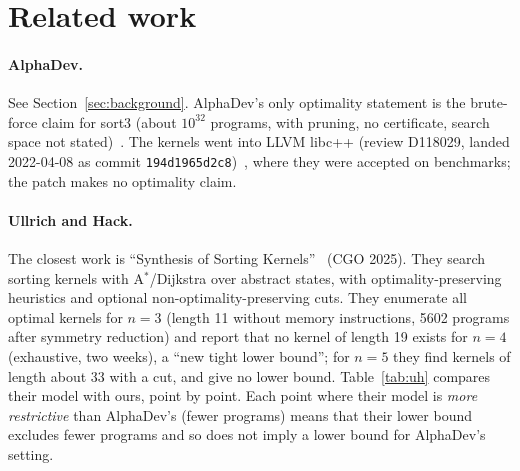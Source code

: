 \section{Related work}\label{sec:related}

\paragraph{AlphaDev.} See Section~\ref{sec:background}. AlphaDev's only optimality statement is the brute-force claim for sort3
(about $10^{32}$ programs, with pruning, no certificate, search space not stated)~\cite{alphadev}. The kernels went into
LLVM libc++ (review D118029, landed 2022-04-08 as commit \texttt{194d1965d2c8})~\cite{d118029}, where they were accepted on
benchmarks; the patch makes no optimality claim.

\paragraph{Ullrich and Hack.} The closest work is ``Synthesis of Sorting Kernels''~\cite{ullrich} (CGO 2025). They search
sorting kernels with A$^\ast$/Dijkstra over abstract states, with optimality-preserving heuristics and optional
non-optimality-preserving cuts. They enumerate all optimal kernels for $n = 3$ (length 11 without memory instructions,
5602 programs after symmetry reduction) and report that no kernel of length 19 exists for $n = 4$ (exhaustive, two weeks), a
``new tight lower bound''; for $n = 5$ they find kernels of length about 33 with a cut, and give no lower bound.
Table~\ref{tab:uh} compares their model with ours, point by point. Each point where their model is \emph{more restrictive}
than AlphaDev's (fewer programs) means that their lower bound excludes fewer programs and so does not imply a lower bound
for AlphaDev's setting.

